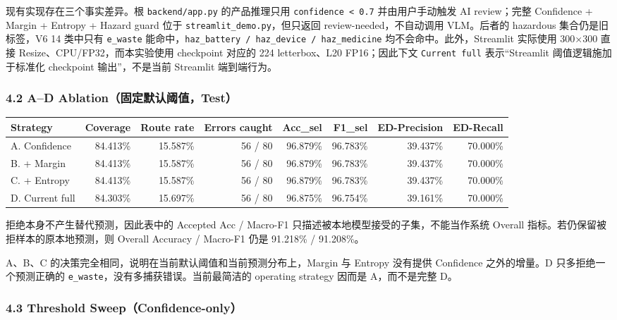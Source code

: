 \documentclass[
  a4paper,
]{article}
\begin{document}
现有实现存在三个事实差异。根 \texttt{backend/app.py} 的产品推理只用
\texttt{confidence\ \textless{}\ 0.7} 并由用户手动触发 AI review；完整
Confidence + Margin + Entropy + Hazard guard 位于
\texttt{streamlit\_demo.py}，但只返回 review-needed，不自动调用
VLM。后者的 hazardous 集合仍是旧标签，V6 14 类中只有 \texttt{e\_waste}
能命中，\texttt{haz\_battery\ /\ haz\_device\ /\ haz\_medicine}
均不会命中。此外，Streamlit 实际使用 300×300 直接
Resize、CPU/FP32，而本实验使用 checkpoint 对应的 224 letterbox、L20
FP16；因此下文 \texttt{Current\ full} 表示``Streamlit
阈值逻辑施加于标准化 checkpoint 输出''，不是当前 Streamlit 端到端行为。

\hypertarget{42-ad-ablationux56faux5b9aux9ed8ux8ba4ux9608ux503ctest}{%
\subsubsection{4.2 A--D
Ablation（固定默认阈值，Test）}\label{42-ad-ablationux56faux5b9aux9ed8ux8ba4ux9608ux503ctest}}

\begingroup
\small
\setlength{\tabcolsep}{3pt}
\begin{longtable}[]{@{}lrrrrrrr@{}}
\toprule
Strategy & Coverage & Route rate & Errors caught & Acc\_sel & F1\_sel &
ED-Precision & ED-Recall \\
\midrule
\endhead
A. Confidence & 84.413\% & 15.587\% & 56 / 80 & 96.879\% & 96.783\% &
39.437\% & 70.000\% \\
B. + Margin & 84.413\% & 15.587\% & 56 / 80 & 96.879\% & 96.783\% &
39.437\% & 70.000\% \\
C. + Entropy & 84.413\% & 15.587\% & 56 / 80 & 96.879\% & 96.783\% &
39.437\% & 70.000\% \\
D. Current full & 84.303\% & 15.697\% & 56 / 80 & 96.875\% & 96.754\% &
39.161\% & 70.000\% \\
\bottomrule
\end{longtable}
\endgroup

拒绝本身不产生替代预测，因此表中的 Accepted Acc / Macro-F1
只描述被本地模型接受的子集，不能当作系统 Overall
指标。若仍保留被拒样本的原本地预测，则 Overall Accuracy / Macro-F1 仍是
91.218\% / 91.208\%。

A、B、C 的决策完全相同，说明在当前默认阈值和当前预测分布上，Margin 与
Entropy 没有提供 Confidence 之外的增量。D 只多拒绝一个预测正确的
\texttt{e\_waste}，没有多捕获错误。当前最简洁的 operating strategy
因而是 A，而不是完整 D。

\hypertarget{43-threshold-sweepconfidence-only}{%
\subsubsection{4.3 Threshold
Sweep（Confidence-only）}\label{43-threshold-sweepconfidence-only}}
\end{document}
